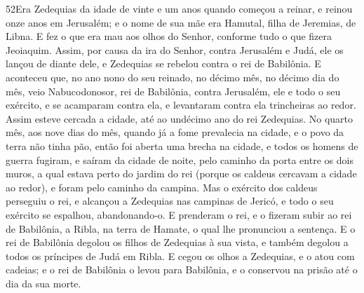 \lettrine{52} Era Zedequias da idade de vinte e um anos quando
começou a reinar, e reinou onze anos em Jerusalém; e o nome de sua
mãe era Hamutal, filha de Jeremias, de Libna. E fez o que era
mau aos olhos do Senhor, conforme tudo o que fizera Jeoiaquim.
Assim, por causa da ira do Senhor, contra Jerusalém e Judá, ele
os lançou de diante dele, e Zedequias se rebelou contra o rei de
Babilônia. E aconteceu que, no ano nono do seu reinado, no
décimo mês, no décimo dia do mês, veio Nabucodonosor, rei de
Babilônia, contra Jerusalém, ele e todo o seu exército, e se
acamparam contra ela, e levantaram contra ela trincheiras ao redor.
Assim esteve cercada a cidade, até ao undécimo ano do rei
Zedequias. No quarto mês, aos nove dias do mês, quando já a fome
prevalecia na cidade, e o povo da terra não tinha pão, então foi
aberta uma brecha na cidade, e todos os homens de guerra fugiram, e
saíram da cidade de noite, pelo caminho da porta entre os dois
muros, a qual estava perto do jardim do rei (porque os caldeus
cercavam a cidade ao redor), e foram pelo caminho da campina.
Mas o exército dos caldeus perseguiu o rei, e alcançou a
Zedequias nas campinas de Jericó, e todo o seu exército se espalhou,
abandonando-o. E prenderam o rei, e o fizeram subir ao rei de
Babilônia, a Ribla, na terra de Hamate, o qual lhe pronunciou a
sentença. E o rei de Babilônia degolou os filhos de Zedequias
à sua vista, e também degolou a todos os príncipes de Judá em Ribla.
E cegou os olhos a Zedequias, e o atou com cadeias; e o rei
de Babilônia o levou para Babilônia, e o conservou na prisão até o
dia da sua morte.


